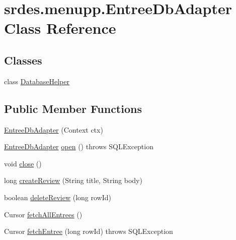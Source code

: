\hypertarget{classsrdes_1_1menupp_1_1_entree_db_adapter}{\section{srdes.\-menupp.\-Entree\-Db\-Adapter \-Class \-Reference}
\label{classsrdes_1_1menupp_1_1_entree_db_adapter}
}
\subsection*{\-Classes}
\begin{DoxyCompactItemize}
\item 
class \hyperlink{classsrdes_1_1menupp_1_1_entree_db_adapter_1_1_database_helper}{\-Database\-Helper}
\end{DoxyCompactItemize}
\subsection*{\-Public \-Member \-Functions}
\begin{DoxyCompactItemize}
\item 
\hyperlink{classsrdes_1_1menupp_1_1_entree_db_adapter_aa0b00cfd3d93f90be8ed87f869fb7ca2}{\-Entree\-Db\-Adapter} (\-Context ctx)
\item 
\hyperlink{classsrdes_1_1menupp_1_1_entree_db_adapter}{\-Entree\-Db\-Adapter} \hyperlink{classsrdes_1_1menupp_1_1_entree_db_adapter_a181116cc8c16753b9ea521f920d0dfa4}{open} ()  throws S\-Q\-L\-Exception 
\item 
void \hyperlink{classsrdes_1_1menupp_1_1_entree_db_adapter_ab21604e068726e3d70e9eb92cb6a9b29}{close} ()
\item 
long \hyperlink{classsrdes_1_1menupp_1_1_entree_db_adapter_a1f618c53ef5e465ece90aed0042d0542}{create\-Review} (\-String title, \-String body)
\item 
boolean \hyperlink{classsrdes_1_1menupp_1_1_entree_db_adapter_a35315a95ee98d3eee5889290a3ac8f6f}{delete\-Review} (long row\-Id)
\item 
\-Cursor \hyperlink{classsrdes_1_1menupp_1_1_entree_db_adapter_ac88958493803b7a929baaf9be984de3a}{fetch\-All\-Entrees} ()
\item 
\-Cursor \hyperlink{classsrdes_1_1menupp_1_1_entree_db_adapter_a85425a7f40134cb0f918ded3aa368fea}{fetch\-Entree} (long row\-Id)  throws S\-Q\-L\-Exception 
\end{DoxyCompactItemize}
